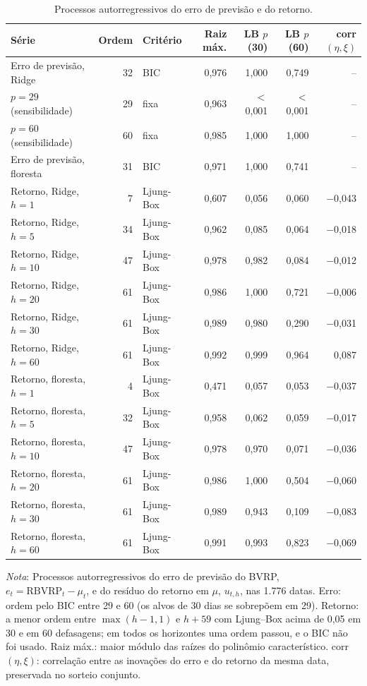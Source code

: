 \begin{table}[H]
\centering
\footnotesize
\caption{Processos autorregressivos do erro de previsão e do retorno.}
\label{tab:apb2-ar}
\begin{tabular}{lrlrrrr}
\toprule
Série & Ordem & Critério & Raiz máx. & LB $p$ (30) & LB $p$ (60) & corr$(\eta, \xi)$ \\
\midrule
Erro de previsão, Ridge & 32 & BIC & 0{,}976 & 1{,}000 & 0{,}749 & -- \\
\quad $p = 29$ (sensibilidade) & 29 & fixa & 0{,}963 & $<$0{,}001 & $<$0{,}001 & -- \\
\quad $p = 60$ (sensibilidade) & 60 & fixa & 0{,}985 & 1{,}000 & 1{,}000 & -- \\
Erro de previsão, floresta & 31 & BIC & 0{,}971 & 1{,}000 & 0{,}741 & -- \\
\addlinespace
Retorno, Ridge, $h = 1$ & 7 & Ljung-Box & 0{,}607 & 0{,}056 & 0{,}060 & $-$0{,}043 \\
Retorno, Ridge, $h = 5$ & 34 & Ljung-Box & 0{,}962 & 0{,}085 & 0{,}064 & $-$0{,}018 \\
Retorno, Ridge, $h = 10$ & 47 & Ljung-Box & 0{,}978 & 0{,}982 & 0{,}084 & $-$0{,}012 \\
Retorno, Ridge, $h = 20$ & 61 & Ljung-Box & 0{,}986 & 1{,}000 & 0{,}721 & $-$0{,}006 \\
Retorno, Ridge, $h = 30$ & 61 & Ljung-Box & 0{,}989 & 0{,}980 & 0{,}290 & $-$0{,}031 \\
Retorno, Ridge, $h = 60$ & 61 & Ljung-Box & 0{,}992 & 0{,}999 & 0{,}964 & 0{,}087 \\
\addlinespace
Retorno, floresta, $h = 1$ & 4 & Ljung-Box & 0{,}471 & 0{,}057 & 0{,}053 & $-$0{,}037 \\
Retorno, floresta, $h = 5$ & 32 & Ljung-Box & 0{,}958 & 0{,}062 & 0{,}059 & $-$0{,}017 \\
Retorno, floresta, $h = 10$ & 47 & Ljung-Box & 0{,}978 & 0{,}970 & 0{,}071 & $-$0{,}036 \\
Retorno, floresta, $h = 20$ & 61 & Ljung-Box & 0{,}986 & 1{,}000 & 0{,}504 & $-$0{,}060 \\
Retorno, floresta, $h = 30$ & 61 & Ljung-Box & 0{,}989 & 0{,}943 & 0{,}109 & $-$0{,}083 \\
Retorno, floresta, $h = 60$ & 61 & Ljung-Box & 0{,}991 & 0{,}993 & 0{,}823 & $-$0{,}069 \\
\bottomrule
\end{tabular}
\par\smallskip
\parbox{0.95\linewidth}{\footnotesize\textit{Nota}: Processos autorregressivos do erro de previsão do BVRP, $e_t = \text{RBVRP}_t - \mu_t$, e do resíduo do retorno em $\mu$, $u_{t,h}$, nas 1.776 datas. Erro: ordem pelo BIC entre 29 e 60 (os alvos de 30 dias se sobrepõem em 29). Retorno: a menor ordem entre $\max(h-1, 1)$ e $h+59$ com Ljung--Box acima de 0,05 em 30 e em 60 defasagens; em todos os horizontes uma ordem passou, e o BIC não foi usado. Raiz máx.: maior módulo das raízes do polinômio característico. corr$(\eta, \xi)$: correlação entre as inovações do erro e do retorno da mesma data, preservada no sorteio conjunto.}
\end{table}
